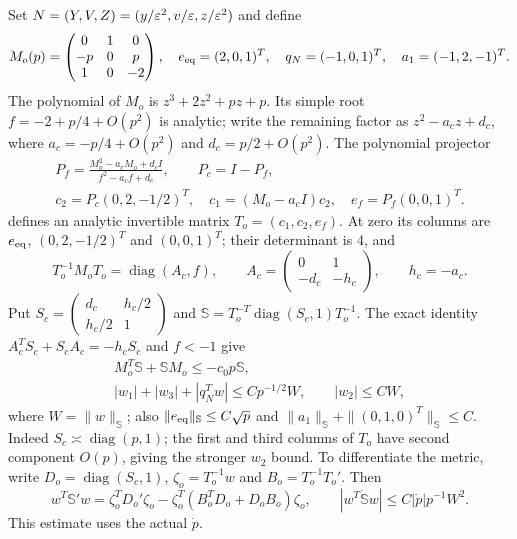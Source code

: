 Set $N=(Y,V,Z)=(y/\varepsilon^2,v/\varepsilon,z/\varepsilon^2)$ and define
\begin{equation}
 M_o(p)=\begin{pmatrix}0&1&0\\-p&0&p\\1&0&-2\end{pmatrix},\quad
 e_{\rm eq}=(2,0,1)^T,\quad q_N=(-1,0,1)^T,\quad a_1=(-1,2,-1)^T.
 \label{ent:normal-matrix}
\end{equation}
The polynomial of $M_o$ is $z^3+2z^2+pz+p$.
Its simple root $f=-2+p/4+O(p^2)$ is analytic; write the remaining
factor as $z^2-a_cz+d_c$, where
$a_c=-p/4+O(p^2)$ and $d_c=p/2+O(p^2)$. The polynomial projector
\[
 \begin{gathered}
 P_f=\frac{M_o^2-a_cM_o+d_cI}{f^2-a_cf+d_c},\qquad P_c=I-P_f,\\
 c_2=P_c(0,2,-1/2)^T,\quad c_1=(M_o-a_cI)c_2,\quad
 e_f=P_f(0,0,1)^T.
 \end{gathered}
\]
defines an analytic invertible matrix $T_o=(c_1,c_2,e_f)$.
At zero its columns are $e_{\rm eq}$, $(0,2,-1/2)^T$ and $(0,0,1)^T$;
their determinant is $4$, and
\[
 T_o^{-1}M_oT_o=\operatorname{diag}(A_c,f),\qquad
 A_c=\begin{pmatrix}0&1\\-d_c&-h_c\end{pmatrix},\qquad h_c=-a_c.
\]
Put $S_c=\left(\begin{smallmatrix}d_c&h_c/2\\h_c/2&1\end{smallmatrix}\right)$
and $\mathbb S=T_o^{-T}\operatorname{diag}(S_c,1)T_o^{-1}$.
The exact identity $A_c^TS_c+S_cA_c=-h_cS_c$ and $f<-1$ give
\begin{equation}
 \begin{gathered}
 M_o^T\mathbb S+\mathbb SM_o\le-c_0p\mathbb S,\\
 |w_1|+|w_3|+|q_N^Tw|\le Cp^{-1/2}W,\qquad |w_2|\le CW,
 \end{gathered}
 \label{ent:energy-weights}
\end{equation}
where $W=\|w\|_{\mathbb S}$; also
$\|e_{\rm eq}\|_{\mathbb S}\le C\sqrt p$ and
$\|a_1\|_{\mathbb S}+\|(0,1,0)^T\|_{\mathbb S}\le C$.
Indeed $S_c\asymp\operatorname{diag}(p,1)$; the first and third
columns of $T_o$ have second component $O(p)$, giving the stronger
$w_2$ bound. To differentiate the metric, write
$D_o=\operatorname{diag}(S_c,1)$, $\zeta_o=T_o^{-1}w$ and
$B_o=T_o^{-1}T_o'$. Then
\[
 w^T\mathbb S'w=\zeta_o^TD_o'\zeta_o
 -\zeta_o^T(B_o^TD_o+D_oB_o)\zeta_o,
 \qquad |w^T\dot{\mathbb S}w|\le C|\dot p|p^{-1}W^2.
\]
This estimate uses the actual $\dot p$.


